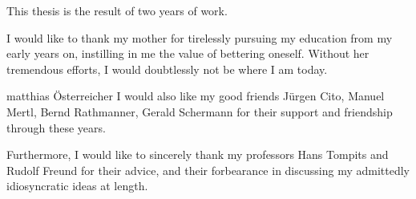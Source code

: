 \documentclass[draft,final]{vutinfth}
\begin{document}
    
    \stdlisting
	
	\frontmatter %
	
	\addstatementpage
	
	\begin{acknowledgements*}
		This thesis is the result of two years of work.
		
		
		I would like to thank my mother for tirelessly pursuing my education from my early years on, instilling in me the value of bettering oneself. Without her tremendous efforts, I would doubtlessly not be where I am today.
		
		matthias \"{O}sterreicher
		I would also like my good friends J\"{u}rgen Cito, Manuel Mertl, Bernd Rathmanner, Gerald Schermann for their support and friendship through these years.
		
		Furthermore, I would like to sincerely thank my professors Hans Tompits and Rudolf Freund for their advice, and their forbearance in discussing my admittedly idiosyncratic ideas at length.
	\end{acknowledgements*}
	
\end{document}

